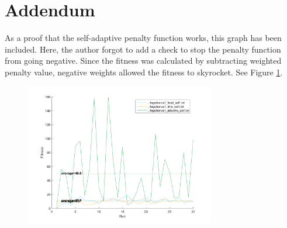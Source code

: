 \documentclass[11pt]{article}
\begin{document}
\section{Addendum}
As a proof that the self-adaptive penalty function works, this graph has been included. Here, the author forgot to add a check to stop the penalty function from going negative. Since the fitness was calculated by subtracting weighted penalty value, negative weights allowed the fitness to skyrocket. See Figure \ref{fig:addendum}.

\begin{figure}[h]
	\centering
  \includegraphics[width=3.25in]{assn1c_bonus1_negative_weights.png}
  \label{fig:addendum}
\end{figure}
\end{document}

